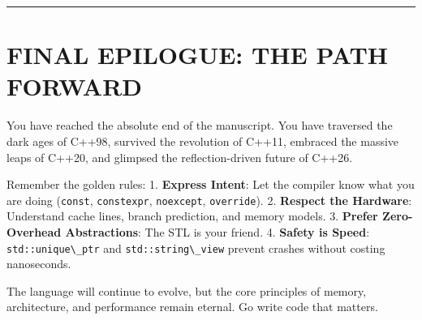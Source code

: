 \begin{center}\rule{0.5\linewidth}{0.5pt}\end{center}

\hypertarget{final-epilogue-the-path-forward}{%
\section{FINAL EPILOGUE: THE PATH
FORWARD}\label{final-epilogue-the-path-forward}}

You have reached the absolute end of the manuscript. You have traversed
the dark ages of C++98, survived the revolution of C++11, embraced the
massive leaps of C++20, and glimpsed the reflection-driven future of
C++26.

Remember the golden rules: 1. \textbf{Express Intent}: Let the compiler
know what you are doing (\passthrough{\lstinline!const!},
\passthrough{\lstinline!constexpr!}, \passthrough{\lstinline!noexcept!},
\passthrough{\lstinline!override!}). 2. \textbf{Respect the Hardware}:
Understand cache lines, branch prediction, and memory models. 3.
\textbf{Prefer Zero-Overhead Abstractions}: The STL is your friend. 4.
\textbf{Safety is Speed}: \passthrough{\lstinline!std::unique\_ptr!} and
\passthrough{\lstinline!std::string\_view!} prevent crashes without
costing nanoseconds.

The language will continue to evolve, but the core principles of memory,
architecture, and performance remain eternal. Go write code that
matters.
